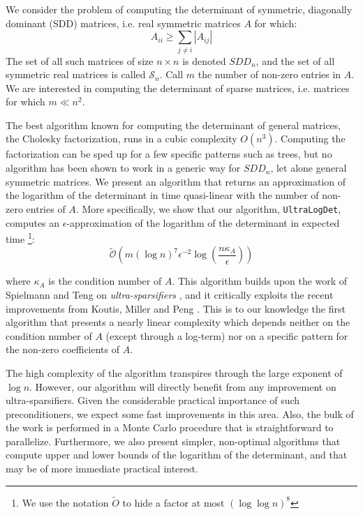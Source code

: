We consider the problem of computing the determinant of symmetric,
diagonally dominant (SDD) matrices, i.e. real symmetric matrices $A$
for which: 
\[
A_{ii}\geq\sum_{j\neq i}\left|A_{ij}\right|
\]
The set of all such matrices of size $n\times n$ is denoted $SDD_{n}$,
and the set of all symmetric real matrices is called $\mathcal{S}_{n}$.
Call $m$ the number of non-zero entries in $A$. We are interested
in computing the determinant of sparse matrices, i.e. matrices for
which $m\ll n^{2}$.

The best algorithm known for computing the determinant of general
matrices, the Cholesky factorization, runs in a cubic complexity $O\left(n^{3}\right)$.
Computing the factorization can be sped up for a few specific patterns
such as trees, but no algorithm has been shown to work in a generic
way for $SDD_{n}$, let alone general symmetric matrices. We present
an algorithm that returns an approximation of the logarithm of the
determinant in time quasi-linear with the number of non-zero entries
of $A$. More specifically, we show that our algorithm, \texttt{UltraLogDet},
computes an $\epsilon$-approximation of the logarithm of the determinant
in expected time%
\footnote{We use the notation $\tilde{O}$ to hide a factor at most $\left(\log\log n\right)^{8}$%
}: 
\[
\tilde{\mathcal{O}}\left(m\left(\log n\right)^{7}\epsilon^{-2}\log\left(\frac{n\kappa_{A}}{\epsilon}\right)\right)
\]


where $\kappa_{A}$ is the condition number of $A$. This algorithm
builds upon the work of Spielmann and Teng on \emph{ultra-sparsifiers}
\cite{Spielman2009a}, and it critically exploits the recent improvements
from Koutis, Miller and Peng \cite{Koutis2010}. This is to our knowledge
the first algorithm that presents a nearly linear complexity which
depends neither on the condition number of $A$ (except through a
log-term) nor on a specific pattern for the non-zero coefficients
of $A$.

The high complexity of the algorithm transpires through the large
exponent of $\log n$. However, our algorithm will directly benefit
from any improvement on ultra-sparsifiers. Given the considerable
practical importance of such preconditioners, we expect some fast
improvements in this area. Also, the bulk of the work is performed
in a Monte Carlo procedure that is straightforward to parallelize.
Furthermore, we also present simpler, non-optimal algorithms that
compute upper and lower bounds of the logarithm of the determinant,
and that may be of more immediate practical interest.

